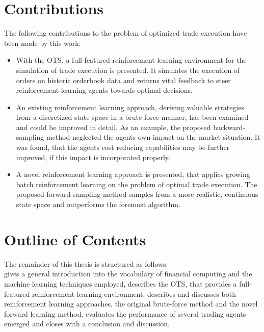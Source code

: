 \section{Contributions}
\label{sec:contributions}
The following contributions to the problem of optimized trade execution have been made by this work:
\begin{itemize}
\item With the \ac{OTS}, a full-featured reinforcement learning environment for the simulation of trade execution is presented. It simulates the execution of orders on historic orderbook data and returns vital feedback to steer reinforcement learning agents towards optimal decisions.

\item An existing reinforcement learning approach, deriving valuable strategies from a discretized state space in a brute force manner, has been examined and could be improved in detail. As an example, the proposed backward-sampling method neglected the agents own impact on the market situation. It was found, that the agents cost reducing capabilities may be further improved, if this impact is incorporated properly.

\item A novel reinforcement learning approach is presented, that applies growing batch reinforcement learning on the problem of optimal trade execution. The proposed forward-sampling method samples from a more realistic, continuous state space and outperforms the foremost algorithm.

\end{itemize}

\section{Outline of Contents}
\label{sec:outline}
The remainder of this thesis is structured as follows:\\

 gives a general introduction into the vocabulary of financial computing and the machine learning techniques employed,  describes the \acl{OTS}, that provides a full-featured reinforcement learning environment.  describes and discusses both reinforcement learning approaches, \ie the original brute-force method and the novel forward learning method.  evaluates the performance of several trading agents emerged and  closes with a conclusion and discussion.


\cleardoublepage{}